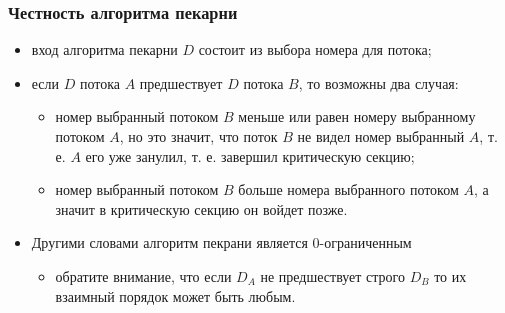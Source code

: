 \begin{frame}
\frametitle{Честность алгоритма пекарни}
\begin{itemize}
  \item вход алгоритма пекарни $D$ состоит из выбора номера для потока;
  \item если $D$ потока $A$ предшествует $D$ потока $B$, то возможны два
  случая:
  \begin{itemize}
    \item номер выбранный потоком $B$ меньше или равен номеру выбранному потоком
    $A$, но это значит, что поток $B$ не видел номер выбранный $A$, т. е. $A$
    его уже занулил, т. е. завершил критическую секцию;
    \item номер выбранный потоком $B$ больше номера выбранного потоком $A$, а
    значит в критическую секцию он войдет позже.
  \end{itemize}
  \item Другими словами алгоритм пекрани является $0$-ограниченным
  \begin{itemize}
    \item обратите внимание, что если $D_A$ не предшествует строго $D_B$ то их
    взаимный порядок может быть любым.
  \end{itemize}
\end{itemize}
\end{frame}
